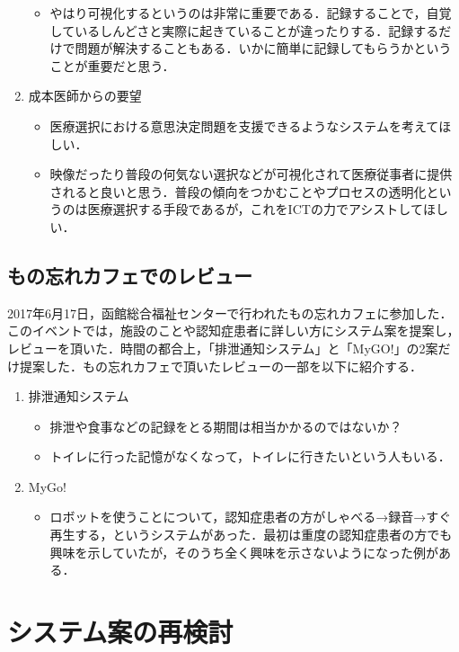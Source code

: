\documentclass[../report]{subfiles}
\begin{document}
\begin{enumerate}
\begin{itemize}
            \item やはり可視化するというのは非常に重要である．記録することで，自覚しているしんどさと実際に起きていることが違ったりする．記録するだけで問題が解決することもある．いかに簡単に記録してもらうかということが重要だと思う．
        \end{itemize}
   \item 成本医師からの要望
        \begin{itemize}
            \item 医療選択における意思決定問題を支援できるようなシステムを考えてほしい．
            \item 映像だったり普段の何気ない選択などが可視化されて医療従事者に提供されると良いと思う．普段の傾向をつかむことやプロセスの透明化というのは医療選択する手段であるが，これをICTの力でアシストしてほしい．
        \end{itemize}
\end{enumerate}

\subsection{もの忘れカフェでのレビュー}
2017年6月17日，函館総合福祉センターで行われたもの忘れカフェに参加した．このイベントでは，施設のことや認知症患者に詳しい方にシステム案を提案し，レビューを頂いた．時間の都合上，「排泄通知システム」と「MyGO!」の2案だけ提案した．もの忘れカフェで頂いたレビューの一部を以下に紹介する．
\begin{enumerate}
    \item 排泄通知システム
        \begin{itemize}
            \item 排泄や食事などの記録をとる期間は相当かかるのではないか？
            \item トイレに行った記憶がなくなって，トイレに行きたいという人もいる．
        \end{itemize}
    \item MyGo!
        \begin{itemize}
            \item ロボットを使うことについて，認知症患者の方がしゃべる→録音→すぐ再生する，というシステムがあった．最初は重度の認知症患者の方でも興味を示していたが，そのうち全く興味を示さないようになった例がある．
        \end{itemize}
\end{enumerate}


\section{システム案の再検討}
\end{document}
